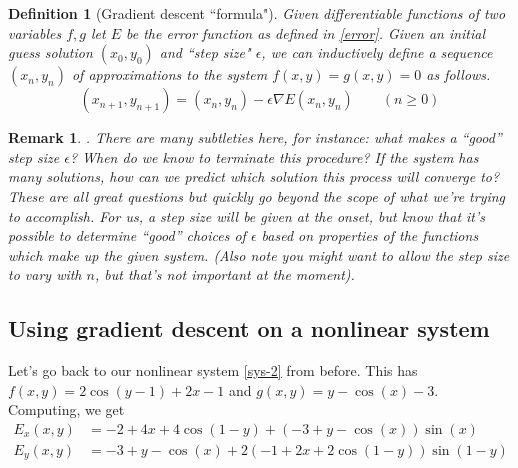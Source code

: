 \documentclass[12pt]{article}
\numberwithin{equation}{subsection}
\numberwithin{figure}{subsection}
\newtheorem{defn}[subsection]{Definition}
\theoremstyle{note}
\newtheorem{remark}[subsection]{Remark}
\begin{document}
{\begin{defn}[Gradient descent ``formula"] Given differentiable functions of two variables $f,g$ let $E$ be the error function as defined in \eqref{error}. Given an initial guess solution $(x_0,y_0)$ and ``step size" $\epsilon$, we can inductively define a sequence $(x_n,y_n)$ of approximations to the system $f(x,y)=g(x,y)=0$ as follows. \begin{equation} (x_{n+1},y_{n+1})=(x_{n},y_{n})-\epsilon \nabla E(x_{n},y_{n}) \qquad ( n \geq 0) \label{gd} \end{equation} 
\end{defn}

\begin{remark}. There are many subtleties here, for instance: what makes a ``good'' step size $\epsilon$? When do we know to terminate this procedure? If the system has many solutions, how can we predict which solution this process will converge to? These are all great questions but quickly go beyond the scope of what we're trying to accomplish. For us, a step size will be given at the onset, but know that it's possible to determine ``good'' choices of $\epsilon$ based on properties of the functions which make up the given system.  (Also note you might want to allow the step size to vary with $n$, but that's not important at the moment). \end{remark}

\subsection{Using gradient descent on a nonlinear system} Let's go back to our nonlinear system \eqref{sys-2} from before. This has $f(x,y)=2\cos(y-1)+2x-1$ and $g(x,y)=y-\cos(x)-3$. Computing, we get \begin{align*} E_x(x,y)&= -2 + 4 x + 4 \cos(1 - y) + (-3 + y - \cos(x)) \sin(x) 
 \\ E_y(x,y)&= -3 + y - \cos(x) + 2 (-1 + 2 x + 2 \cos(1 - y)) \sin(1 - y) \end{align*}

}
\end{document}
